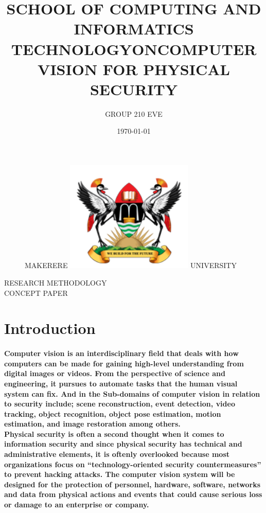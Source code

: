 \documentclass[11pt]{article}
\begin{document}
		
\title{SCHOOL OF COMPUTING AND INFORMATICS\\ TECHNOLOGY}
\author{GROUP 210 EVE}
\date{\today{}}
\begin{figure}
	\begin{center}
	\Huge MAKERERE \includegraphics[width=172pt]{muk.png} \Huge UNIVERSITY
	\end{center}
\end{figure}
	\maketitle
	
	\begin{center}
	RESEARCH METHODOLOGY \\CONCEPT PAPER
	\end{center}
\begin{center}
	\title{ON}
\end{center}
	\begin{center}
		\title{COMPUTER VISION FOR PHYSICAL SECURITY}
	\end{center}
    
	\newpage
	\section{ \textbf{Introduction} }
	 \paragraph{\textmd{Computer vision is an interdisciplinary field that deals with how computers can be made for gaining high-level understanding from digital images or videos. From the perspective of science and engineering, it pursues to automate tasks that the human visual system can fix.\cite{DUMMY:4}
And in the Sub-domains of computer vision in relation to security include; scene reconstruction, event detection, video tracking, object recognition, object pose estimation, motion estimation, and image restoration among others.\\
Physical security is often a second thought when it comes to information security and since physical security has technical and administrative elements, it is oftenly overlooked because most organizations focus on “technology-oriented security countermeasures” \cite{DUMMY:2} to prevent hacking attacks.
The computer vision system will be designed for the protection of personnel, hardware, software, networks and data from physical actions and events that could cause serious loss or damage to an enterprise or company.}}
	 
\end{document}
